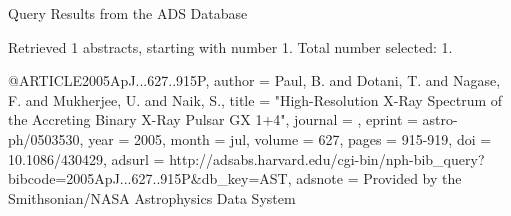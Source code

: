 Query Results from the ADS Database


Retrieved 1 abstracts, starting with number 1.  Total number selected: 1.

@ARTICLE{2005ApJ...627..915P,
   author = {{Paul}, B. and {Dotani}, T. and {Nagase}, F. and {Mukherjee}, U. and 
	{Naik}, S.},
    title = "{High-Resolution X-Ray Spectrum of the Accreting Binary X-Ray Pulsar GX 1+4}",
  journal = {\apj},
   eprint = {astro-ph/0503530},
     year = 2005,
    month = jul,
   volume = 627,
    pages = {915-919},
      doi = {10.1086/430429},
   adsurl = {http://adsabs.harvard.edu/cgi-bin/nph-bib_query?bibcode=2005ApJ...627..915P&db_key=AST},
  adsnote = {Provided by the Smithsonian/NASA Astrophysics Data System}
}


